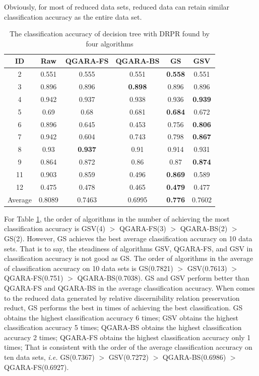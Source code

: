 \documentclass[review]{elsarticle}
\begin{document}
		Obviously, for most of reduced data sets, reduced data can retain similar classification accuracy as the entire data set. 
		\begin{table}[htbp]
			\centering
			\caption{The classification accuracy of decision tree with DRPR found by four algorithms}
			\begin{tabular}{cccccc}
				\hline
				ID    & Raw   & QGARA-FS & QGARA-BS & GS    & GSV \\\hline
				2     & 0.551 & 0.555 & 0.551 & \textbf{0.558} & 0.551 \\
				3     & 0.896 & 0.896 & \textbf{0.898} & 0.896 & 0.896 \\
				4     & 0.942 & 0.937 & 0.938 & 0.936 & \textbf{0.939} \\
				5     & 0.69  & 0.68  & 0.681 & \textbf{0.684} & 0.672 \\
				6     & 0.896 & 0.645 & 0.453 & 0.756 & \textbf{0.806} \\
				7     & 0.942 & 0.604 & 0.743 & 0.798 & \textbf{0.867} \\
				8     & 0.93  & \textbf{0.937} & 0.91  & 0.914 & 0.931 \\
				9     & 0.864 & 0.872 & 0.86  & 0.87  & \textbf{0.874} \\
				11    & 0.903 & 0.859 & 0.496 & \textbf{0.869} & 0.589 \\
				12    & 0.475 & 0.478 & 0.465 & \textbf{0.479} & 0.477 \\\hline
				Average & 0.8089 & 0.7463 & 0.6995 & \textbf{0.776} & 0.7602 \\\hline
			\end{tabular}%
			\label{cadtd}%
		\end{table}%
		\par For Table \ref{cadtd}, the order of algorithms in the number of achieving the most classification accuracy is GSV(4) $>$ QGARA-FS(3) $>$ QGARA-BS(2) $>$ GS(2). However, GS achieves the best average classification accuracy on 10 data sets. That is to say, the steadiness of algorithms GSV, QGARA-FS, and GSV in classification accuracy is not good as GS. The order of algorithms in the average of classification accuracy on 10 data sets is GS(0.7821) $>$ GSV(0.7613) $>$ QGARA-FS(0.751) $>$ QGARA-BS(0.7038). GS and GSV perform better than QGARA-FS and QGARA-BS in the average classification accuracy. When comes to the reduced data generated by relative discernibility relation preservation reduct, GS performs the best in times of achieving the best classification. GS obtains the highest classification accuracy 6 times; GSV obtains the highest classification accuracy 5 times; QGARA-BS obtains the highest classification accuracy 2 times; QGARA-FS obtains the highest classification accuracy only 1 times; That is consistent with the order of the average classification accuracy on ten data sets, \emph{i.e.} GS(0.7367) $>$ GSV(0.7272) $>$ QGARA-BS(0.6986) $>$ QGARA-FS(0.6927). 
\end{document}
